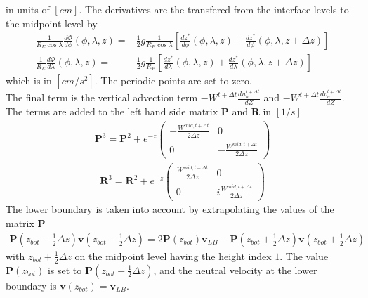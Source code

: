 %
in units of $[cm]$. The derivatives are the transfered from the
interface levels to the midpoint level by
%
\begin{align}
  \frac{1}{R_E \cos \lambda}\frac{d \Phi}{d \phi}(\phi,\lambda,z) = &
  \frac{1}{2} g \frac{1}{R_E \cos \lambda}\left[ \frac{d z^*}
  {d \phi}(\phi,\lambda,z) + \frac{d z^*}{d \phi}(\phi,\lambda,z+\Delta z)\right]  \\
  \frac{1}{R_E} \frac{d \Phi}{d \lambda}(\phi,\lambda,z) = & \frac{1}{2} g \frac{1}{R_E }
        \left[ \frac{d z^*}{d \lambda}(\phi,\lambda,z) + \frac{d z^*}{d \lambda}(\phi,\lambda,z+\Delta z)\right]
\end{align}
%
which is in $[cm/s^2]$. 
The
periodic points are set to zero. \\
%
The final term is the vertical advection term $- W^{t+\Delta t}
\frac{d u_n^{t+\Delta t}}{d Z}$ and $- W^{t+\Delta t} \frac{d
v_n^{t+\Delta t}}{d Z}$. The terms are added to the left hand side
matrix $\mathbf{P}$ and $\mathbf{R}$ in $[1/s]$
%
\begin{gather}
  \mathbf{P}^3= \mathbf{P}^2 + e^{-z}
   \begin{pmatrix}
       -\frac{W^{mid,t+\Delta t}}{2 \Delta z} & 0 \\
       0 & -\frac{W^{mid,t+\Delta t}}{2 \Delta z}
   \end{pmatrix}
\end{gather}
%
%
\begin{gather}
  \mathbf{R}^3= \mathbf{R}^2 + e^{-z}
   \begin{pmatrix}
       \frac{W^{mid,t+\Delta t}}{2 \Delta z} & 0 \\
       0 & i\frac{W^{mid,t+\Delta t}}{2 \Delta z}
   \end{pmatrix}
\end{gather}
%
The lower boundary is taken into account by extrapolating the values
of the matrix $\mathbf{P}$
%
\begin{align}
     \mathbf{P}(z_{bot}-\frac{1}{2}\Delta z)\mathbf{v}(z_{bot}-\frac{1}{2}\Delta z)=
     2 \mathbf{P}(z_{bot})\mathbf{v}_{LB} -
     \mathbf{P}(z_{bot}+\frac{1}{2}\Delta z)\mathbf{v}(z_{bot}+\frac{1}{2}\Delta z)
\end{align}
%
with $z_{bot}+\frac{1}{2}\Delta z$ on the midpoint level having the
height index $1$. The value $\mathbf{P}(z_{bot})$ is set to
$\mathbf{P}(z_{bot}+\frac{1}{2}\Delta z)$, and the neutral velocity
at the lower boundary is $\mathbf{v}(z_{bot}) = \mathbf{v}_{LB}$.
